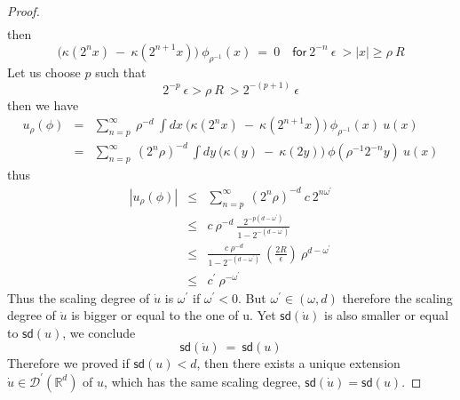\documentclass[10pt]{book}
\newcommand{\sd}{\mathsf{sd}}
\newcommand{\abs}[1]{\left|#1\right|}
\let\int\int
\newcommand{\Dcal}{\mathcal{D}}
\newcommand{\Rbb}{\mathbb{R}}
\theoremstyle{break}
\begin{document}
\begin{proof}
\begin{eqnarray*}
 \end{eqnarray*}
 then
 \begin{equation*}
  \bigg( \kappa(2^n x) \ - \ \kappa(2^{n+1} x) \bigg) \ \phi_{\rho^{-1}}(x) \ = \ 0 \quad \mathsf{for} \ 2^{-n} \ \epsilon \ > \abs{x} \geq \rho \ R
 \end{equation*}
 Let us choose $p$ such that 
 \begin{equation*}
  2^{-p} \ \epsilon > \rho \ R \ > 2^{-(p+1)} \ \epsilon
 \end{equation*}
 then we have
 \begin{eqnarray*}
  u_\rho(\phi) &=& \sum_{n=p}^{\infty} \ \rho^{-d} \ \int dx \ \bigg( \kappa(2^n x) \ - \ \kappa(2^{n+1} x) \bigg) \ \phi_{\rho^{-1}}(x) \ u(x) \\
  &=& \sum_{n=p}^{\infty} \ (2^n\rho)^{-d} \ \int dy \ \bigg( \kappa(y) \ - \ \kappa(2 y) \bigg) \ \phi(\rho^{-1}2^{-n}y) \ u(x) 
 \end{eqnarray*}
 thus
 \begin{eqnarray*}
  \abs{u_\rho(\phi)} &\leq& \sum_{n=p}^{\infty} \ (2^n\rho)^{-d} \ c \ 2^{n\omega^\prime} \\
  &\leq& c \ \rho^{-d} \ \frac{2^{-p(d-\omega^\prime)}}{1 - 2^{-(d-\omega^\prime)}} \\
  &\leq& \frac{c \ \rho^{-d}}{1 - 2^{-(d-\omega^\prime)}} \ \left( \frac{2R}{\epsilon} \right) \ \rho^{d-\omega^\prime} \\
  &\leq& c^\prime \ \rho^{-\omega^\prime}
 \end{eqnarray*}
 Thus the scaling degree of $\dot{u}$ is $\omega^\prime$ if $\omega^\prime < 0$. But $\omega^\prime \in (\omega,d)$ therefore the scaling degree of $\dot{u}$ is bigger or equal to the one of u. Yet $\sd(\dot{u})$ is also smaller or equal to $\sd(u)$, we conclude 
 \begin{equation*}
  \sd(\dot{u}) \ = \ \sd(u)  
 \end{equation*}
 Therefore we proved if $\sd(u)<d$, then there exists a unique extension $\dot{u} \in \Dcal^\prime(\Rbb^d)$ of $u$, which has the same scaling degree, $\sd(\dot{u})=\sd(u)$. 
 

\end{proof}
\end{document}
